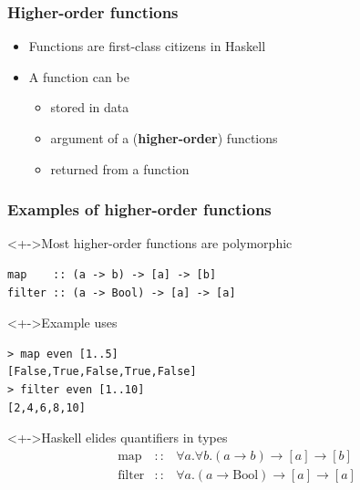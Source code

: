\documentclass{beamer}
\subtitle{Higher-order functions}
\begin{document}
\begin{frame}
  \titlepage
\end{frame}
\begin{frame}[fragile]
  \frametitle{Higher-order functions}
  \begin{itemize}
  \item Functions are first-class citizens in Haskell
  \item A function can be
    \begin{itemize}
    \item stored in data
    \item argument of a (\textbf{higher-order}) functions
    \item returned from a function
    \end{itemize}
  \end{itemize}
\end{frame}
\begin{frame}[fragile]
  \frametitle{Examples of higher-order functions}

  \begin{block}<+->{Most higher-order functions are polymorphic}
\begin{verbatim}
map    :: (a -> b) -> [a] -> [b]
filter :: (a -> Bool) -> [a] -> [a]
\end{verbatim}
  \end{block}
  \begin{block}<+->{Example uses}
\begin{verbatim}
> map even [1..5]
[False,True,False,True,False]
> filter even [1..10]
[2,4,6,8,10]
\end{verbatim}
  \end{block}
  \begin{alertblock}<+->{Haskell elides quantifiers in types}
    \vspace{-\baselineskip}
    \begin{eqnarray*}
      \text{map} & :: & \forall a. \forall b. (a \to b) \to [a] \to [b] \\
      \text{filter} & :: & \forall a. (a \to \text{Bool}) \to [a] \to [a]
    \end{eqnarray*}
  \end{alertblock}
\end{frame}
\end{document}

